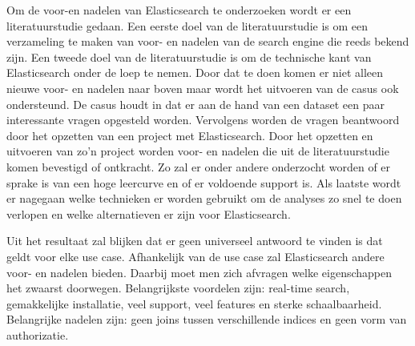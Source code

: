 Om de voor-en nadelen van Elasticsearch te onderzoeken wordt er een literatuurstudie gedaan. Een eerste doel van de literatuurstudie is om een verzameling te maken van voor- en nadelen van de search engine die reeds bekend zijn. Een tweede doel van de literatuurstudie is om de technische kant van Elasticsearch onder de loep te nemen. Door dat te doen komen er niet alleen nieuwe voor- en nadelen naar boven maar wordt het uitvoeren van de casus ook ondersteund. De casus houdt in dat er aan de hand van een dataset een paar interessante vragen opgesteld worden. Vervolgens worden de vragen beantwoord door het opzetten van een project met Elasticsearch.
Door het opzetten en uitvoeren van zo'n project worden voor- en nadelen die uit de literatuurstudie komen bevestigd of ontkracht. Zo zal er onder andere onderzocht worden of er sprake is van een hoge leercurve en of er voldoende support is. Als laatste wordt er nagegaan welke technieken er worden gebruikt om de analyses zo snel te doen verlopen en welke alternatieven er zijn voor Elasticsearch.

Uit het resultaat zal blijken dat er geen universeel antwoord te vinden is dat geldt voor elke use case. Afhankelijk van de use case zal Elasticsearch andere voor- en nadelen bieden. Daarbij moet men zich afvragen welke eigenschappen het zwaarst doorwegen. Belangrijkste voordelen zijn: real-time search, gemakkelijke installatie, veel support, veel features en sterke schaalbaarheid. Belangrijke nadelen zijn: geen joins tussen verschillende indices en geen vorm van authorizatie.


